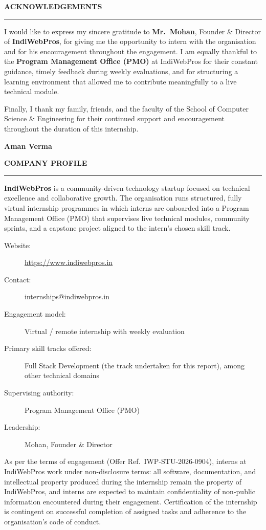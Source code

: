 \documentclass[12pt,oneside,a4paper]{report}
\newcommand{\rfrontheading}[1]{%
  \begin{center}
    {\fontsize{14}{17}\selectfont\bfseries #1\par}
  \end{center}
  \noindent\rule{\textwidth}{0.8pt}\par\vspace{10pt}
}
\begin{document}
\clearpage
\rfrontheading{ACKNOWLEDGEMENTS}
\noindent
I would like to express my sincere gratitude to \textbf{Mr.\ Mohan}, Founder
\& Director of \textbf{IndiWebPros}, for giving me the opportunity to intern
with the organisation and for his encouragement throughout the engagement. I
am equally thankful to the \textbf{Program Management Office (PMO)} at
IndiWebPros for their constant guidance, timely feedback during weekly
evaluations, and for structuring a learning environment that allowed me to
contribute meaningfully to a live technical module.

Finally, I thank my family, friends, and the faculty of the School of
Computer Science \& Engineering for their continued support and
encouragement throughout the duration of this internship.

\vspace{1.0cm}
\noindent\textbf{Aman Verma}

\clearpage
\rfrontheading{COMPANY PROFILE}
\noindent
\textbf{IndiWebPros} is a community-driven technology startup focused on
technical excellence and collaborative growth. The organisation runs
structured, fully virtual internship programmes in which interns are
onboarded into a Program Management Office (PMO) that supervises live
technical modules, community sprints, and a capstone project aligned to the
intern's chosen skill track.

\begin{description}
\item[Website:] \url{https://www.indiwebpros.in}
\item[Contact:] internships@indiwebpros.in
\item[Engagement model:] Virtual / remote internship with weekly evaluation
\item[Primary skill tracks offered:] Full Stack Development (the track
  undertaken for this report), among other technical domains
\item[Supervising authority:] Program Management Office (PMO)
\item[Leadership:] Mohan, Founder \& Director
\end{description}

\noindent
As per the terms of engagement (Offer Ref.\ IWP-STU-2026-0904), interns at
IndiWebPros work under non-disclosure terms: all software, documentation, and
intellectual property produced during the internship remain the property of
IndiWebPros, and interns are expected to maintain confidentiality of
non-public information encountered during their engagement. Certification of
the internship is contingent on successful completion of assigned tasks and
adherence to the organisation's code of conduct.
\end{document}

